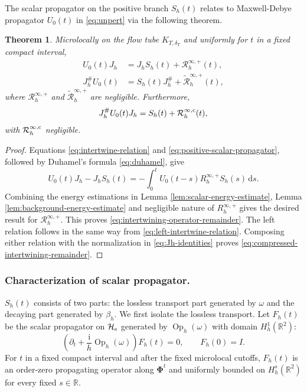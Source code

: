 \documentclass[11pt,reqno]{amsart}
\newtheorem{theorem}{Theorem}[section]
\newcommand{\ii}{\mathrm{i}}
\newcommand{\dd}{\,\mathrm{d}}
\newcommand{\Op}{\operatorname{Op}}
\numberwithin{equation}{section}
\begin{document}
The scalar propagator on the positive branch $S_h(t)$ relates to Maxwell-Debye propagator $U_0(t)$ in \eqref{eq:unpert} via the following theorem.
\begin{theorem}
Microlocally on the flow tube $K_{T,\delta_T}$ and uniformly for $t$ in a fixed compact interval,
\begin{align}
    U_0(t)J_h&=J_hS_h(t)+\mathcal R_h^{\infty,+}(t),
    \label{eq:intertwining-operator-remainder}\\
    J_h^{\#}U_0(t)&=S_h(t)J_h^{\#}+\widetilde{\mathcal R}_h^{\infty,+}(t),
    \label{eq:left-intertwining-operator-remainder}
\end{align}
where $\mathcal R_h^{\infty,+}$ and $\widetilde{\mathcal R}_h^{\infty,+}$ are negligible. Furthermore,
\begin{equation}\label{eq:compressed-intertwining-remainder}
    J_h^{\#}U_0(t)J_h=S_h(t)+\mathcal R_h^{\infty,{\rm c}}(t),
\end{equation}
with $\mathcal R_h^{\infty,{\rm c}}$ negligible.
\end{theorem}
\begin{proof}
Equations \eqref{eq:intertwine-relation} and \eqref{eq:positive-scalar-propagator}, followed by Duhamel's formula \eqref{eq:duhamel}, give
\begin{equation*}
U_0(t)J_h-J_hS_h(t)=-\int_0^tU_0(t-s)R_h^{\infty,+}S_h(s)\dd s.
\end{equation*}
Combining the energy estimations in Lemma \ref{lem:scalar-energy-estimate}, Lemma \ref{lem:background-energy-estimate} and negligible nature of $R_h^{\infty, +}$ gives the desired result for $\mathcal R_h^{\infty,+}$. This proves \eqref{eq:intertwining-operator-remainder}. The left relation follows in the same way from \eqref{eq:left-intertwine-relation}. Composing either relation with the normalization in \eqref{eq:Jh-identities} proves \eqref{eq:compressed-intertwining-remainder}.
\end{proof}


\subsubsection{Characterization of scalar propagator.}
$S_h(t)$ consists of two parts: the lossless transport part generated by $\omega$ and the decaying part generated by $\beta_h$. We first isolate the lossless transport. Let $F_h(t)$ be the scalar propagator on $\mathcal H_{\rm s}$ generated by $\Op_h(\omega)$ with domain $H_h^1(\mathbb R^2)$:
\begin{equation}\label{eq:lossless-propagator}
    \left(\partial_t+\frac{\ii}{h}\Op_h(\omega)\right)F_h(t)=0,
    \qquad F_h(0)=I.
\end{equation}
For $t$ in a fixed compact interval and after the fixed microlocal cutoffs, $F_h(t)$ is an order-zero propagating operator along $\bm\Phi^t$ and uniformly bounded on $H_h^s(\mathbb R^2)$ for every fixed $s\in\mathbb R$.
\end{document}
